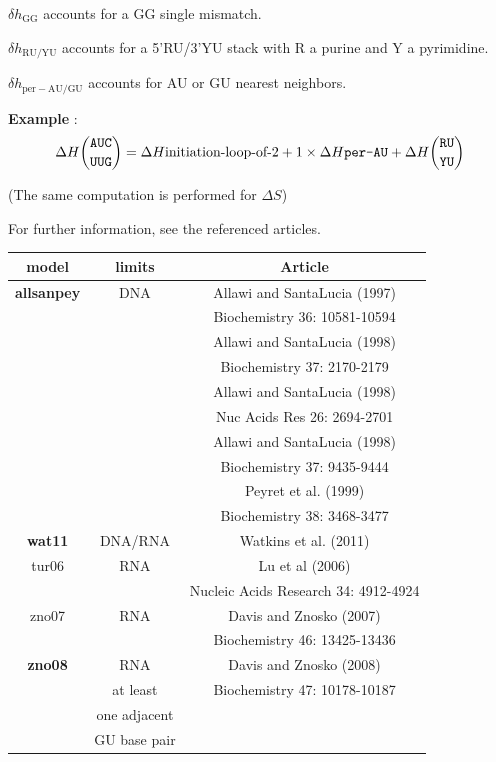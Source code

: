 \documentclass{article}
\begin{document}
$\delta{}h_\mathrm{GG}$ accounts for a GG single mismatch.

$\delta{}h_\mathrm{RU/YU}$ accounts for a 5'RU/3'YU stack with R a purine and Y a pyrimidine.

$\delta{}h_\mathrm{per-AU/GU}$ accounts for AU or GU nearest neighbors.

\textbf{Example} :
\begin{multline*}
\Delta H {\mbox{\texttt{AUC}} \choose \mbox{\texttt{UUG}}} =
\Delta H {\mbox{initiation-loop-of-2}} + 
1 \times \Delta H {\mbox{\texttt{per-AU}} } +
\Delta H {\mbox{\texttt{RU}} \choose \mbox{\texttt{YU}} } \\
\end{multline*}

       (The same computation is performed for $\Delta S$)
       
For further information, see the referenced articles.

\begin{table}[hc]
\begin{tabular}[h]{| c | c | c |}
\textbf{model} & \textbf{limits} & \textbf{Article} \\
 \hline
\textbf{allsanpey} & DNA & Allawi and SantaLucia (1997)\\
 & & Biochemistry 36: 10581-10594 \\
 & & Allawi and SantaLucia (1998)\\
 & & Biochemistry 37: 2170-2179 \\
 & & Allawi and SantaLucia (1998)\\
 & & Nuc Acids Res 26: 2694-2701 \\
 & & Allawi and SantaLucia (1998)\\
 & & Biochemistry 37: 9435-9444 \\
 & & Peyret et al. (1999)\\
 & & Biochemistry 38: 3468-3477 \\
 \hline
\textbf{wat11} & DNA/RNA & Watkins et al. (2011) \\
 \hline 
tur06 & RNA & Lu et al (2006)\\
 & & Nucleic Acids Research 34: 4912-4924 \\
 \hline
zno07 & RNA & Davis and Znosko (2007)\\
 & & Biochemistry 46: 13425-13436 \\
 \hline
\textbf{zno08} & RNA & Davis and Znosko (2008)\\
 & at least & Biochemistry 47: 10178-10187 \\
 & one adjacent & \\
 & GU base pair & \\
 \hline
\end{tabular}
\end{table}
\pagebreak
\end{document}

